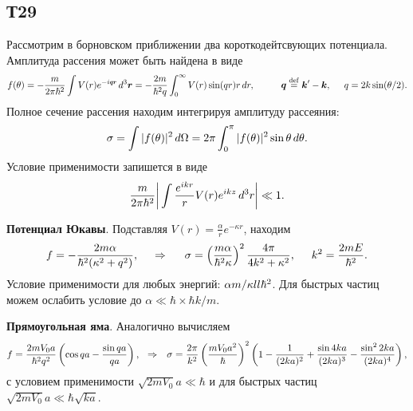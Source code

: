 \subsection*{Т29}

Рассмотрим в борновском приближении два короткодейтсвующих потенциала. Амплитуда рассения может быть найдена в виде
\begin{equation*}
	f(\theta) = - \frac{m}{2 \pi \hbar^2} \int V(r) e^{-i \smallvc{q} \smallvc{r}} \d^3 \vc{r} = - \frac{2m}{\hbar^2 q} \int_{0}^{\infty} V(r) \sin(qr) r \d r,
	\hspace{10 mm} 
	\vc{q} \overset{\mathrm{def}}{=} \vc{k}' - \vc{k},
	\hspace{5 mm} 
	q = 2 k \sin(\theta/2).
\end{equation*}
Полное сечение рассения находим интегрируя амплитуду рассеяния:
\begin{equation*}
	\sigma = \int |f(\theta)|^2 \, d \Omega = 2 \pi \int_{0}^{\pi} |f(\theta)|^2 \sin \theta \, d \theta.
\end{equation*}
Условие применимости запишется в виде
\begin{equation*}
	\frac{m}{2\pi \hbar^2} \bigg| \int \frac{e^{i k r}}{r} V(r) e^{i k z} \, d^3 r \bigg| \ll 1.
\end{equation*}


\textbf{Потенциал Юкавы}. Подставляя $V(r) = \frac{\alpha}{r} e^{- \kappa r}$, находим
\begin{equation*}
	f = - \frac{2 m \alpha}{\hbar^2 (\kappa^2 + q^2)},
	\hspace{0.5cm} \Rightarrow \hspace{0.5cm}
	\sigma = \left(\frac{m \alpha}{\hbar^2 \kappa}\right)^2 \frac{4\pi}{4 k^2 + \kappa^2},
	\hspace{5 mm} 
	k^2 = \frac{2 mE}{\hbar^2}.
\end{equation*}
Условие применимости для любых энергий: $\alpha m / \kappa \\ll \hbar^2$. Для быстрых частиц можем ослабить условие до $\alpha \ll \hbar \times \hbar k/m$.

\textbf{Прямоугольная яма}. Аналогично вычисляем
\begin{equation*}
	f = \frac{2m V_0 a}{\hbar^2 q^2} \left(\cos qa - \frac{\sin q a}{qa}\right),
	\hspace{0.25cm} \Rightarrow \hspace{0.25cm}
	\sigma = \frac{2\pi}{k^2}\left(
		\frac{m V_0 a^2}{\hbar}
	\right)^2 \left(
		1 - \frac{1}{(2ka)^2} + \frac{\sin 4 ka}{(2 ka)^3} - \frac{\sin^2 2ka}{(2ka)^4}
	\right),
\end{equation*}
с условием применимости $\sqrt{2 m V_0} a \ll \hbar$ и для быстрых частиц $\sqrt{2 m V_0} a \ll  \hbar \sqrt{ka}$.